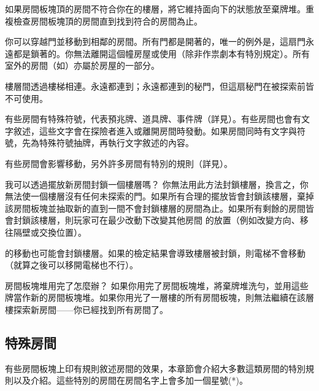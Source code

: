 如果房間板塊頂的房間不符合你在的樓層，將它維持面向下的狀態放至棄牌堆。重複檢查房間板塊頂的房間直到找到符合的房間為止。

你可以穿越門並移動到相鄰的房間。所有門都是開著的，唯一的例外是，這扇門永遠都是鎖著的。你無法離開這個幢房屋或使用（除非作祟劇本有特別規定）。所有室外的房間（如）亦屬於房屋的一部分。

樓層間透過樓梯相連。永遠都連到；永遠都連到的秘門，但這扇秘門在被探索前皆不可使用。

有些房間有特殊符號，代表預兆牌、道具牌、事件牌（詳見）。有些房間也會有文字敘述，這些文字會在探險者進入或離開房間時發動。如果房間同時有文字與符號，先為特殊符號抽牌，再執行文字敘述的內容。

有些房間會影響移動，另外許多房間有特別的規則（詳見）。

\begin{RuleBox}{我可以透過擺放新房間封鎖一個樓層嗎？}
  你無法用此方法封鎖樓層，換言之，你無法使一個樓層沒有任何未探索的門。如果所有合理的擺放皆會封鎖該樓層，棄掉該房間板塊並抽取新的直到一間不會封鎖樓層的房間為止。如果所有剩餘的房間皆會封鎖該樓層，則玩家可在最少改動下改變其他房間 的放置（例如改變方向、移往隔壁或交換位置）。

  的移動也可能會封鎖樓層。如果的檢定結果會導致樓層被封鎖，則電梯不會移動（就算之後可以移開電梯也不行）。
\end{RuleBox}

\begin{RuleBox}{房間板塊堆用完了怎麼辦？}
  如果你用完了房間板塊堆，將棄牌堆洗勻，並用這些牌當作新的房間板塊堆。如果你用光了一層樓的所有房間板塊，則無法繼續在該層樓探索新房間——你已經找到所有房間了。
\end{RuleBox}


\subsection{特殊房間} \label{ssec:special-rooms}

有些房間板塊上印有規則敘述房間的效果，本章節會介紹大多數這類房間的特別規則以及介紹。這些特別的房間在房間名字上會多加一個星號(*)。

